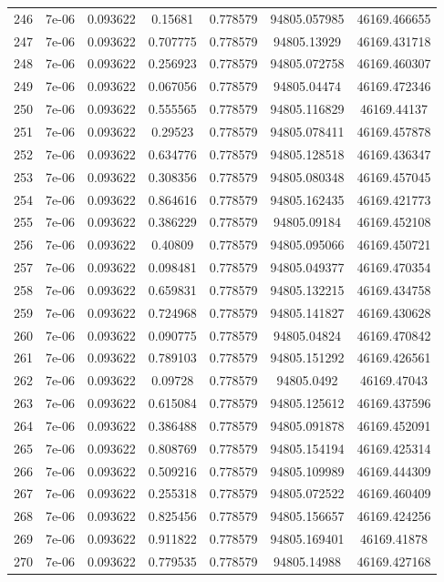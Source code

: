 \begin{table}
\begin{tabular*}{\linewidth}{c|c|c|c|c|c|c}
246 & 7e-06 & 0.093622 & 0.15681 & 0.778579 & 94805.057985 & 46169.466655\\
247 & 7e-06 & 0.093622 & 0.707775 & 0.778579 & 94805.13929 & 46169.431718\\
248 & 7e-06 & 0.093622 & 0.256923 & 0.778579 & 94805.072758 & 46169.460307\\
249 & 7e-06 & 0.093622 & 0.067056 & 0.778579 & 94805.04474 & 46169.472346\\
250 & 7e-06 & 0.093622 & 0.555565 & 0.778579 & 94805.116829 & 46169.44137\\
251 & 7e-06 & 0.093622 & 0.29523 & 0.778579 & 94805.078411 & 46169.457878\\
252 & 7e-06 & 0.093622 & 0.634776 & 0.778579 & 94805.128518 & 46169.436347\\
253 & 7e-06 & 0.093622 & 0.308356 & 0.778579 & 94805.080348 & 46169.457045\\
254 & 7e-06 & 0.093622 & 0.864616 & 0.778579 & 94805.162435 & 46169.421773\\
255 & 7e-06 & 0.093622 & 0.386229 & 0.778579 & 94805.09184 & 46169.452108\\
256 & 7e-06 & 0.093622 & 0.40809 & 0.778579 & 94805.095066 & 46169.450721\\
257 & 7e-06 & 0.093622 & 0.098481 & 0.778579 & 94805.049377 & 46169.470354\\
258 & 7e-06 & 0.093622 & 0.659831 & 0.778579 & 94805.132215 & 46169.434758\\
259 & 7e-06 & 0.093622 & 0.724968 & 0.778579 & 94805.141827 & 46169.430628\\
260 & 7e-06 & 0.093622 & 0.090775 & 0.778579 & 94805.04824 & 46169.470842\\
261 & 7e-06 & 0.093622 & 0.789103 & 0.778579 & 94805.151292 & 46169.426561\\
262 & 7e-06 & 0.093622 & 0.09728 & 0.778579 & 94805.0492 & 46169.47043\\
263 & 7e-06 & 0.093622 & 0.615084 & 0.778579 & 94805.125612 & 46169.437596\\
264 & 7e-06 & 0.093622 & 0.386488 & 0.778579 & 94805.091878 & 46169.452091\\
265 & 7e-06 & 0.093622 & 0.808769 & 0.778579 & 94805.154194 & 46169.425314\\
266 & 7e-06 & 0.093622 & 0.509216 & 0.778579 & 94805.109989 & 46169.444309\\
267 & 7e-06 & 0.093622 & 0.255318 & 0.778579 & 94805.072522 & 46169.460409\\
268 & 7e-06 & 0.093622 & 0.825456 & 0.778579 & 94805.156657 & 46169.424256\\
269 & 7e-06 & 0.093622 & 0.911822 & 0.778579 & 94805.169401 & 46169.41878\\
270 & 7e-06 & 0.093622 & 0.779535 & 0.778579 & 94805.14988 & 46169.427168\\
\end{tabular*}
\end{table}
